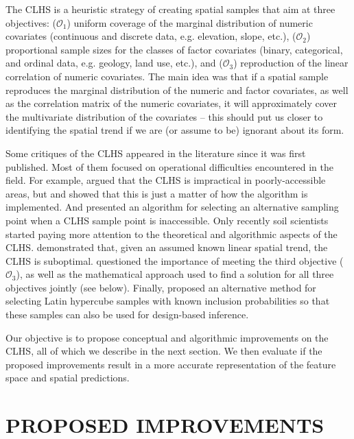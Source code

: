 The CLHS is a heuristic strategy of creating spatial samples that aim at three objectives: ($\mathcal{O}_1$) 
uniform coverage of the marginal distribution of numeric covariates (continuous and discrete data, e.g. 
elevation, slope, etc.), ($\mathcal{O}_2$) proportional sample sizes for the classes of factor covariates 
(binary, categorical, and ordinal data, e.g. geology, land use, etc.), and ($\mathcal{O}_3$) reproduction of 
the linear correlation of numeric covariates. The main idea was that if a spatial sample reproduces the 
marginal distribution of the numeric and factor covariates, as well as the correlation matrix of the numeric 
covariates, it will approximately cover the multivariate distribution of the covariates -- this should put us 
closer to identifying the  spatial trend if we are (or assume to be) ignorant about its form.

Some critiques of the CLHS appeared in the literature since it was first published. Most of them focused on 
operational difficulties encountered in the field. For example, \citet{CambuleEtAl2013} argued that the 
CLHS is impractical in poorly-accessible areas, but \citet{RoudierEtAl2012} and 
\citet{MulderEtAl2013} showed that this is just a matter of how the algorithm is implemented. And 
\citet{CliffordEtAl2014} presented an algorithm for selecting an alternative sampling point when a CLHS 
sample point is inaccessible. Only recently soil scientists started paying more attention to the theoretical 
and algorithmic aspects of the CLHS. \citet{MinasnyEtAl2010a} demonstrated that, given an assumed known 
linear spatial trend, the CLHS is suboptimal. \citet{CliffordEtAl2014} questioned the importance of 
meeting the third objective ($\mathcal{O}_3$), as well as the mathematical approach used to find a solution 
for all three objectives jointly (see below). Finally, \citet{Brus2015} proposed an alternative method 
for selecting Latin hypercube samples with known inclusion probabilities so that these samples can also be 
used for design-based inference.

Our objective is to propose conceptual and algorithmic improvements on the CLHS, all of which we describe in 
the next section. We then evaluate if the proposed improvements result in a more accurate representation of 
the feature space and spatial predictions.

\section{PROPOSED IMPROVEMENTS}

